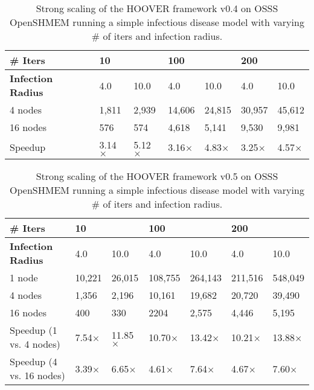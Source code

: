\begin{table}
\centering
\begin{tabularx}{\textwidth}{ | l || X | X | X | X | X | X | }
\hline
\textbf{\# Iters}           & \multicolumn{2}{|X|}{\textbf{10}} & \multicolumn{2}{|X|}{\textbf{100}} & \multicolumn{2}{|X|}{\textbf{200}} \\\hline
\textbf{Infection Radius}   & 4.0          & 10.0         & 4.0           & 10.0          & 4.0           & 10.0 \\\hline
4 nodes                     &  1,811       & 2,939        & 14,606       & 24,815       & 30,957       & 45,612 \\\hline
16 nodes                    &   576        &  574         &  4,618       &  5,141       &  9,530       &  9,981 \\\hline
Speedup                     & 3.14$\times$ & 5.12$\times$ & 3.16$\times$ & 4.83$\times$ & 3.25$\times$ & 4.57$\times$ \\\hline
\end{tabularx}
\caption{Strong scaling of the HOOVER framework v0.4 on OSSS OpenSHMEM running a
    simple infectious disease model with varying \# of iters and infection
    radius.}
\label{tab:strong_scaling4}
\end{table}

\begin{table}
\centering
\begin{tabularx}{\textwidth}{ | l || X | X | X | X | X | X | }
\hline
\textbf{\# Iters}           & \multicolumn{2}{|X|}{\textbf{10}} & \multicolumn{2}{|X|}{\textbf{100}} & \multicolumn{2}{|X|}{\textbf{200}} \\\hline
\textbf{Infection Radius}   & 4.0          & 10.0          & 4.0           & 10.0          & 4.0           & 10.0 \\\hline
1 node                      & 10,221       & 26,015        & 108,755       & 264,143       & 211,516       & 548,049 \\\hline
4 nodes                     & 1,356        & 2,196         & 10,161        & 19,682        & 20,720        & 39,490  \\\hline
16 nodes                    & 400          & 330           & 2204          & 2,575         & 4,446         & 5,195 \\\hline
Speedup (1 vs. 4 nodes)     & 7.54$\times$ & 11.85$\times$ & 10.70$\times$ & 13.42$\times$ & 10.21$\times$ & 13.88$\times$ \\\hline
Speedup (4 vs. 16 nodes)    & 3.39$\times$ & 6.65$\times$  & 4.61$\times$  & 7.64$\times$  & 4.67$\times$  & 7.60$\times$ \\\hline
\end{tabularx}
\caption{Strong scaling of the HOOVER framework v0.5 on OSSS OpenSHMEM running a
    simple infectious disease model with varying \# of iters and infection
    radius.}
\label{tab:strong_scaling5}
\end{table}


